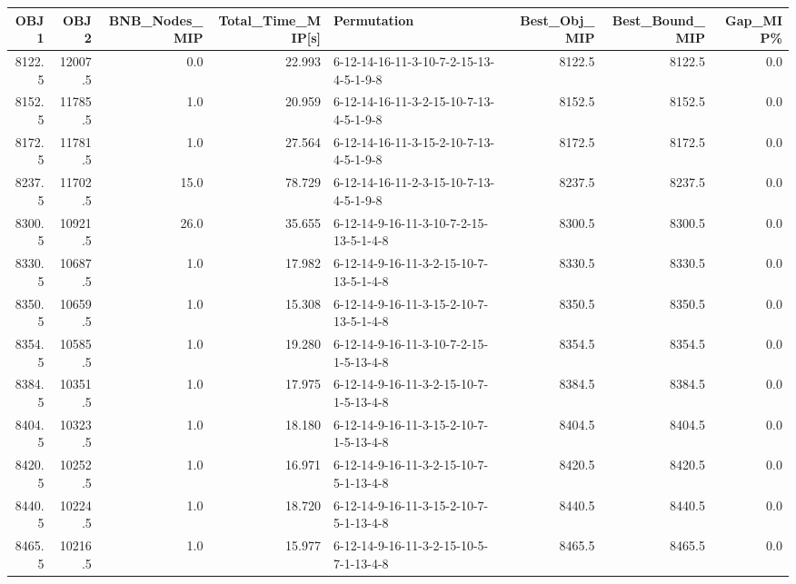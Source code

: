 \begin{tabular}{rrrrlrrr}
\toprule
    OBJ1 &     OBJ2 &  BNB\_Nodes\_MIP &  Total\_Time\_MIP[s] &                             Permutation &  Best\_Obj\_MIP &  Best\_Bound\_MIP &  Gap\_MIP\% \\
\midrule
  8122.5 &  12007.5 &            0.0 &             22.993 &  6-12-14-16-11-3-10-7-2-15-13-4-5-1-9-8 &        8122.5 &          8122.5 &       0.0 \\
  8152.5 &  11785.5 &            1.0 &             20.959 &  6-12-14-16-11-3-2-15-10-7-13-4-5-1-9-8 &        8152.5 &          8152.5 &       0.0 \\
  8172.5 &  11781.5 &            1.0 &             27.564 &  6-12-14-16-11-3-15-2-10-7-13-4-5-1-9-8 &        8172.5 &          8172.5 &       0.0 \\
  8237.5 &  11702.5 &           15.0 &             78.729 &  6-12-14-16-11-2-3-15-10-7-13-4-5-1-9-8 &        8237.5 &          8237.5 &       0.0 \\
  8300.5 &  10921.5 &           26.0 &             35.655 &  6-12-14-9-16-11-3-10-7-2-15-13-5-1-4-8 &        8300.5 &          8300.5 &       0.0 \\
  8330.5 &  10687.5 &            1.0 &             17.982 &  6-12-14-9-16-11-3-2-15-10-7-13-5-1-4-8 &        8330.5 &          8330.5 &       0.0 \\
  8350.5 &  10659.5 &            1.0 &             15.308 &  6-12-14-9-16-11-3-15-2-10-7-13-5-1-4-8 &        8350.5 &          8350.5 &       0.0 \\
  8354.5 &  10585.5 &            1.0 &             19.280 &  6-12-14-9-16-11-3-10-7-2-15-1-5-13-4-8 &        8354.5 &          8354.5 &       0.0 \\
  8384.5 &  10351.5 &            1.0 &             17.975 &  6-12-14-9-16-11-3-2-15-10-7-1-5-13-4-8 &        8384.5 &          8384.5 &       0.0 \\
  8404.5 &  10323.5 &            1.0 &             18.180 &  6-12-14-9-16-11-3-15-2-10-7-1-5-13-4-8 &        8404.5 &          8404.5 &       0.0 \\
  8420.5 &  10252.5 &            1.0 &             16.971 &  6-12-14-9-16-11-3-2-15-10-7-5-1-13-4-8 &        8420.5 &          8420.5 &       0.0 \\
  8440.5 &  10224.5 &            1.0 &             18.720 &  6-12-14-9-16-11-3-15-2-10-7-5-1-13-4-8 &        8440.5 &          8440.5 &       0.0 \\
  8465.5 &  10216.5 &            1.0 &             15.977 &  6-12-14-9-16-11-3-2-15-10-5-7-1-13-4-8 &        8465.5 &          8465.5 &       0.0 \\

\end{tabular}
